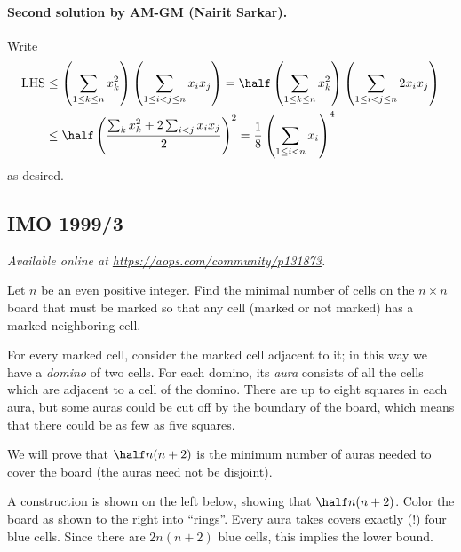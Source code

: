 \documentclass[11pt]{scrartcl}
\begin{document}
\paragraph{Second solution by AM-GM (Nairit Sarkar).}
Write
\begin{align*}
  \text{LHS}
  &\le \left( \sum_{1 \le k \le n} x_k^2 \right)
  \left( \sum_{1 \le i < j \le n} x_i x_j \right)
  = \half \left( \sum_{1 \le k \le n} x_k^2 \right)
  \left( \sum_{1 \le i < j \le n} 2 x_i x_j \right) \\
  &\le \half \left( \frac{\sum_k x_k^2 + 2 \sum_{i<j} x_i x_j}{2}  \right)^2
  = \frac 18 \left( \sum_{1 \le i < n} x_i \right)^4
\end{align*}
as desired.
\pagebreak

\subsection{IMO 1999/3}
\textsl{Available online at \url{https://aops.com/community/p131873}.}
\begin{mdframed}[style=mdpurplebox,frametitle={Problem statement}]
Let $n$ be an even positive integer.
Find the minimal number of cells on the $n \times n$ board
that must be marked so that any cell
(marked or not marked) has a marked neighboring cell.
\end{mdframed}
For every marked cell, consider the marked cell adjacent
to it; in this way we have a \emph{domino} of two cells.
For each domino, its \emph{aura} consists of all the cells
which are adjacent to a cell of the domino.
There are up to eight squares in each aura,
but some auras could be cut off by the boundary of the board,
which means that there could be as few as five squares.

We will prove that $\half n (n+2)$
is the minimum number of auras
needed to cover the board
(the auras need not be disjoint).
\begin{itemize}
  \ii A construction is shown on the left below,
  showing that $\half n (n+2)$.
  \ii Color the board as shown to the right into ``rings''.
  Every aura takes covers exactly (!) four blue cells.
  Since there are $2n(n+2)$ blue cells, this implies the lower bound.
\end{itemize}
\end{document}
